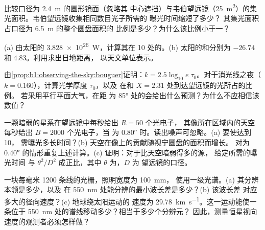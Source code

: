 \begin{exercise}[$\star\star$]\label{exo:b1:observing-the-sky:8}
比较口径为 \qty{2.4}{m} 的圆形镜面（忽略其
中心遮挡）与韦伯望远镜（\qty{25}{m^2}）的集光面积。韦伯望远镜收集相同数目光子所需的
曝光时间缩短了多少？
其集光面积占口径为 \qty{6.5}{m} 的整个圆盘面积的
比例是多少？为什么该比例小于一？
\end{exercise}

\begin{exercise}[$\star\star$]\label{exo:b1:observing-the-sky:9}
(a) 由太阳的 \qty{3.828e26}{W}，计算其在
\qty{10}{\parsec} 处的。(b) 太阳的和分别为
$-26.74$ 和 $4.83$。利用求出日地距离，
以天文单位表示。
\end{exercise}

\begin{exercise}[$\star\star\star$]\label{exo:b1:observing-the-sky:10}
由\cref{prop:b1:observing-the-sky:bouguer}证明：$k =
2.5\log_{10}e\;\tau_0$。对于消光线之夜（$k =
\num{0.160}$），计算光学厚度 $\tau_0$，以及
在和 $X = 2.31$ 处到达望远镜的光所占的比例。
若采用平行平面大气，在距
为 \ang{85} 处的会给出什么预测？为什么不应相信该数值？
\end{exercise}

\begin{exercise}[$\star\star\star$]\label{exo:b1:observing-the-sky:11}
一颗暗弱的星系在望远镜中每秒给出 $R = 50$ 个光电子，
其像所在区域内的天空每秒给出 $B = \num{2000}$ 个光电子，当
为 \ang{;;0.80} 时。读出噪声可忽略。(a) 要使达到 10，
需曝光多长时间？(b) 天空在像上的贡献随视宁圆盘的面积而增长。
对为 \ang{;;0.40} 的情形重复上述计算。(c) 证明：对于比天空暗弱得多的源，
给定所需的曝光时间
与 $\theta^2/D^2$ 成正比，其中 $\theta$ 为，$D$ 为
望远镜的口径。
\end{exercise}

\begin{exercise}[$\star\star\star$]\label{exo:b1:observing-the-sky:12}
一块每毫米 1200 条线的光栅，照明宽度为 \qty{100}{mm}，
使用一级光谱。(a) 其分辨本领是多少，以及
在 \qty{550}{nm} 处能分辨的最小波长差是多少？(b) 该波长差
对应多大的径向速度？(c) 地球绕太阳运动的
速度为 \qty{29.78}{km.s^{-1}}。这一运动能使一条位于
\qty{550}{nm} 处的谱线移动多少？相当于多少个分辨元？
因此，测量恒星视向速度的观测者必须怎样做？
\end{exercise}

